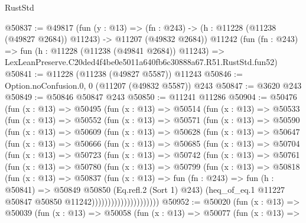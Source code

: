 \begin{lexlean}{RustStd}
\begin{coremodule}
@50837 := @49817
    (fun (y : @13) =>
    (fn : @243) -> (h : @11228 (@11238 (@49827 @2684)) @11243) -> @11207 (@49832 @2684))
    @11242
    (fun (fn : @243) =>
    fun (h : @11228 (@11238 (@49841 @2684)) @11243) =>
    LexLeanPreserve.C20ded4f4be0e5011a640fb6c30888a67.R51.RustStd.fun52)
@50841 := @11228 (@11238 (@49827 @5587)) @11243
@50846 := Option.noConfusion.{0, 0} (@11207 (@49832 @5587)) @243
@50847 := @3620 @243
@50849 := @50846 @50847 @243
@50850 := @11241 @11286
@50904 := @50476
    (fun (x : @13) =>
    @50495
      (fun (x : @13) =>
      @50514
        (fun (x : @13) =>
        @50533
          (fun (x : @13) =>
          @50552
            (fun (x : @13) =>
            @50571
              (fun (x : @13) =>
              @50590
                (fun (x : @13) =>
                @50609
                  (fun (x : @13) =>
                  @50628
                    (fun (x : @13) =>
                    @50647
                      (fun (x : @13) =>
                      @50666
                        (fun (x : @13) =>
                        @50685
                          (fun (x : @13) =>
                          @50704
                            (fun (x : @13) =>
                            @50723
                              (fun (x : @13) =>
                              @50742
                                (fun (x : @13) =>
                                @50761
                                  (fun (x : @13) =>
                                  @50780
                                    (fun (x : @13) =>
                                    @50799
                                      (fun (x : @13) =>
                                      @50818
                                        (fun (x : @13) =>
                                        @50837
                                          (fun (x : @13) =>
                                          fun (fn : @243) =>
                                          fun (h : @50841) =>
                                          @50849
                                            @50850
                                            (Eq.refl.{2} (Sort 1) @243)
                                            (heq_of_eq.{1}
                                              @11227
                                              @50847
                                              @50850
                                              @11242)))))))))))))))))))))
@50952 := @50020
    (fun (x : @13) =>
    @50039
      (fun (x : @13) =>
      @50058
        (fun (x : @13) =>
        @50077
          (fun (x : @13) =>

\end{coremodule}
\end{lexlean}
